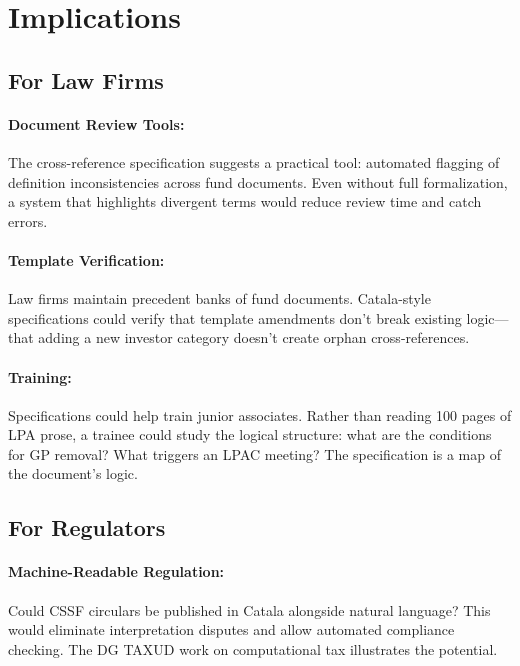 
\section{Implications}
\label{sec:implications}

\subsection{For Law Firms}
\label{sec:law-firms}

\paragraph{Document Review Tools:} The cross-reference specification suggests a practical tool: automated flagging of definition inconsistencies across fund documents. Even without full formalization, a system that highlights divergent terms would reduce review time and catch errors.

\paragraph{Template Verification:} Law firms maintain precedent banks of fund documents. Catala-style specifications could verify that template amendments don't break existing logic---that adding a new investor category doesn't create orphan cross-references.

\paragraph{Training:} Specifications could help train junior associates. Rather than reading 100 pages of LPA prose, a trainee could study the logical structure: what are the conditions for GP removal? What triggers an LPAC meeting? The specification is a map of the document's logic.

\subsection{For Regulators}
\label{sec:regulators}

\paragraph{Machine-Readable Regulation:} Could CSSF circulars be published in Catala alongside natural language? This would eliminate interpretation disputes and allow automated compliance checking. The DG TAXUD work on computational tax illustrates the potential.

